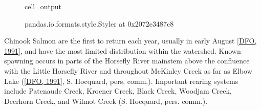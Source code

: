\documentclass[letterpaper,10pt,english]{jupyterBook}
\begin{document}
\begin{figure}[htbp]
\centering
\capstart
\begin{sphinxVerbatimOutput}

\begin{sphinxuseclass}{cell_output}
\begin{sphinxVerbatim}[commandchars=\\\{\}]
\PYGZlt{}pandas.io.formats.style.Styler at 0x2072e3487c8\PYGZgt{}
\end{sphinxVerbatim}

\end{sphinxuseclass}\end{sphinxVerbatimOutput}
\caption{}\label{\detokenize{Planning:table4}}\end{figure}

\sphinxAtStartPar
Chinook Salmon are the first to return each year, usually in early August {[}\hyperlink{cite.references:id11}{DFO, 1991}{]}, and have the most limited distribution within the watershed. Known spawning occurs in parts of the Horsefly River mainstem above the confluence with the Little Horsefly River and throughout McKinley Creek as far as Elbow Lake ({[}\hyperlink{cite.references:id11}{DFO, 1991}{]}, S. Hocquard, pers. comm.). Important rearing systems include Patenaude Creek, Kroener Creek, Black Creek, Woodjam Creek, Deerhorn Creek, and Wilmot Creek (S. Hocquard, pers. comm.).
\end{document}
